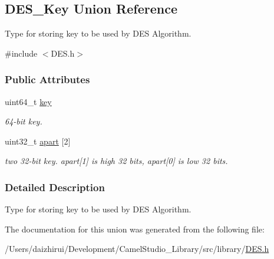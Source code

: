 \hypertarget{a00111}{}\subsection{D\+E\+S\+\_\+\+Key Union Reference}
\label{a00111}


Type for storing key to be used by D\+ES Algorithm.  




{\ttfamily \#include $<$D\+E\+S.\+h$>$}

\subsubsection*{Public Attributes}
\begin{DoxyCompactItemize}
\item 
\mbox{\label{a00111_a48b5dadf7decf3076826072563041f1b}} 
uint64\+\_\+t \mbox{\hyperlink{a00111_a48b5dadf7decf3076826072563041f1b}{key}}
\begin{DoxyCompactList}\small\item\em 64-\/bit key. \end{DoxyCompactList}\item 
\mbox{\label{a00111_a3e14395e8ac22e9e775a243041daaeeb}} 
uint32\+\_\+t \mbox{\hyperlink{a00111_a3e14395e8ac22e9e775a243041daaeeb}{apart}} \mbox{[}2\mbox{]}
\begin{DoxyCompactList}\small\item\em two 32-\/bit key. apart\mbox{[}1\mbox{]} is high 32 bits, apart\mbox{[}0\mbox{]} is low 32 bits. \end{DoxyCompactList}\end{DoxyCompactItemize}


\subsubsection{Detailed Description}
Type for storing key to be used by D\+ES Algorithm. 

The documentation for this union was generated from the following file\+:\begin{DoxyCompactItemize}
\item 
/\+Users/daizhirui/\+Development/\+Camel\+Studio\+\_\+\+Library/src/library/\mbox{\hyperlink{a00011}{D\+E\+S.\+h}}\end{DoxyCompactItemize}

